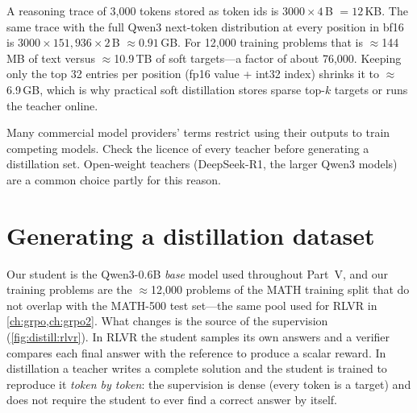 \begin{napkinmath}
A reasoning trace of 3{,}000 tokens stored as token ids is $3000\times 4$\,B $=12$\,KB. The
same trace with the full Qwen3 next-token distribution at every position in bf16 is
$3000 \times 151{,}936 \times 2$\,B $\approx 0.91$\,GB. For 12{,}000 training problems that is
$\approx$144\,MB of text versus $\approx$10.9\,TB of soft targets---a factor of about 76{,}000.
Keeping only the top 32 entries per position (fp16 value + int32 index) shrinks it to
$\approx$6.9\,GB, which is why practical soft distillation stores sparse top-$k$ targets or
runs the teacher online.
\end{napkinmath}

\begin{pitfall}
Many commercial model providers' terms restrict using their outputs to train competing
models. Check the licence of every teacher before generating a distillation set. Open-weight
teachers (DeepSeek-R1, the larger Qwen3 models) are a common choice partly for this reason.
\end{pitfall}

\section{Generating a distillation dataset}\label{sec:distill:generate}

Our student is the Qwen3-0.6B \emph{base} model used throughout Part~V, and our training
problems are the $\approx$12{,}000 problems of the MATH training split that do not overlap with
the MATH-500 test set---the same pool used for RLVR in \cref{ch:grpo,ch:grpo2}. What changes
is the source of the supervision (\cref{fig:distill:rlvr}). In RLVR the student samples its
own answers and a verifier compares each final answer with the reference to produce a scalar
reward. In distillation a teacher writes a complete solution and the student is trained to
reproduce it \emph{token by token}: the supervision is dense (every token is a target) and
does not require the student to ever find a correct answer by itself.

